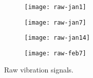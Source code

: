 \begin{figure}[!h]
    \centering
    \begin{subfigure}{6cm}
        \centering\texttt{[image: raw-jan1]}
    \end{subfigure}%
    \begin{subfigure}{6cm}
        \centering\texttt{[image: raw-jan7]}
    \end{subfigure}\vspace{10pt}
 
    \begin{subfigure}{6cm}
        \centering\texttt{[image: raw-jan14]}
    \end{subfigure}%
    \begin{subfigure}{6cm}
        \centering\texttt{[image: raw-feb7]}
    \end{subfigure}
    \caption{Raw vibration signals.}
    \label{fig:raw-signals}
\end{figure}